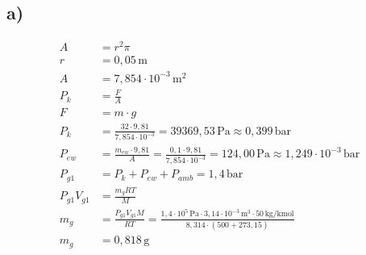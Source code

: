 

\subsection*{a)}
\begin{align*}
    A &= r^2 \pi \\
    r &= 0{,}05 \, \text{m} \\
    A &= 7{,}854 \cdot 10^{-3} \, \text{m}^2 \\
    P_{k} &= \frac{F}{A} \\
    F &= m \cdot g \\
    P_{k} &= \frac{32 \cdot 9{,}81}{7{,}854 \cdot 10^{-3}} = 39369{,}53 \, \text{Pa} \approx 0{,}399 \, \text{bar} \\
    P_{ew} &= \frac{m_{ew} \cdot 9{,}81}{A} = \frac{0{,}1 \cdot 9{,}81}{7{,}854 \cdot 10^{-3}} = 124{,}00 \, \text{Pa} \approx 1{,}249 \cdot 10^{-3} \, \text{bar} \\
    P_{g1} &= P_{k} + P_{ew} + P_{amb} = 1{,}4 \, \text{bar} \\
    P_{g1} V_{g1} &= \frac{m_{g} R T}{M} \\
    m_{g} &= \frac{P_{g1} V_{g1} M}{R T} = \frac{1{,}4 \cdot 10^5 \, \text{Pa} \cdot 3{,}14 \cdot 10^{-3} \, \text{m}^3 \cdot 50 \, \text{kg/kmol}}{8{,}314 \cdot (500 + 273{,}15)} \\
    m_{g} &= 0{,}818 \, \text{g}
\end{align*}